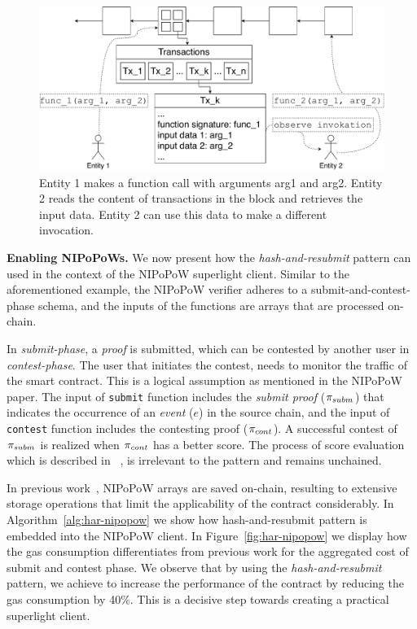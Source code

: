 \begin{figure}[h]
    \begin{center}
        \includegraphics[width=1\columnwidth]{figures/observer-tx.pdf}
    \end{center}
    \caption{Entity 1 makes a function call with arguments arg1 and arg2.
    Entity 2 reads the content of transactions in the block and retrieves the
    input data. Entity 2 can use this data to make a different invocation.}
    \label{fig:observe-tx}
\end{figure}

\noindent \textbf{Enabling NIPoPoWs.} We now present how the
\emph{hash-and-resubmit} pattern can used in the context of the NIPoPoW
superlight client. Similar to the aforementioned example, the NIPoPoW verifier
adheres to a submit-and-contest-phase schema, and the inputs of the functions
are arrays that are processed on-chain.

In \emph{submit-phase}, a \emph{proof} is submitted, which can be contested by
another user in \emph{contest-phase}.  The user that initiates the contest,
needs to monitor the traffic of the smart contract. This is a logical
assumption as mentioned in the NIPoPoW paper. The input of \texttt{submit}
function includes the \emph{submit proof} ($\pi_{subm}$) that indicates the
occurrence of an \emph{event} ($e$) in the source chain, and the input of
\texttt{contest} function includes the contesting proof ($\pi_{cont}$). A successful
contest of $\pi_{subm}$ is realized when $\pi_{cont}$ has a better score. The process of
score evaluation which is described in ~\cite{nipopows}, is irrelevant to the
pattern and remains unchained.

In previous work~\cite{gglou}, NIPoPoW arrays are saved on-chain, resulting to
extensive storage operations that limit the applicability of the contract
considerably. In Algorithm~\ref{alg:har-nipopow} we show how hash-and-resubmit
pattern is embedded into the NIPoPoW client. In Figure~\ref{fig:har-nipopow} we
display how the gas consumption differentiates from previous work for the
aggregated cost of submit and contest phase. We observe that by using the
\emph{hash-and-resubmit} pattern, we achieve to increase the performance of the
contract by reducing the gas consumption by 40\%. This is a decisive step
towards creating a practical superlight client.

